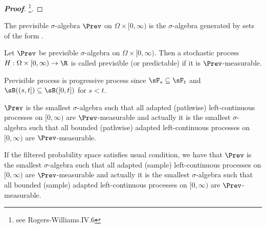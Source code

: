 \begin{proof}[\bf Proof]
\footnote{see Rogers-Williams\cite{Rogers_1994}.IV.6}.
\end{proof}

\begin{definition}\label{def:previsible_sigma_algebra_with_zero}
The previsible $\sigma$-algebra $\Prev$ on $\Omega \times [0,\infty)$ is the $\sigma$-algebra generated by sets of the form 
\be
\bra{E \times(s, t]: E \in \sF_s, s < t} \cup {}.
\ee%
\end{definition}

\begin{definition}\label{def:previsible_process_continuous_without_zero}
Let $\Prev$ be previsible $\sigma$-algebra on $\Omega \times [0,\infty)$. Then a stochastic process $H: \Omega \times [0,\infty) \to \R$ is called previsible (or predictable) if it is $\Prev$-measurable.%
\end{definition}

\begin{remark}
Previsible process is progressive process since $\sF_s\subseteq \sF_t$ and $\sB((s,t])\subseteq \sB([0,t])$ for $s<t$.
\end{remark}



\begin{theorem}\label{thm:previsible_sigma_algebra_contains_all_adapted_left_continuous_process}
$\Prev$ is the smallest $\sigma$-algebra such that all adapted (pathwise) left-continuous processes on $[0,\infty)$ are $\Prev$-measurable and actually it is the smallest $\sigma$-algebra such that all bounded (pathwise) adapted left-continuous processes on $[0,\infty)$ are $\Prev$-measurable.%

If the filtered probability space satisfies usual condition, we have that $\Prev$ is the smallest $\sigma$-algebra such that all adapted (sample) left-continuous processes on $[0,\infty)$ are $\Prev$-measurable and actually it is the smallest $\sigma$-algebra such that all bounded (sample) adapted left-continuous processes on $[0,\infty)$ are $\Prev$-measurable.%
\end{theorem}

